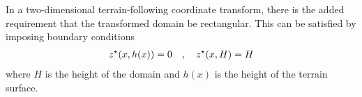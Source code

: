 In a two-dimensional terrain-following coordinate transform, there is the added requirement that the transformed domain be rectangular.  This can be satisfied by imposing boundary conditions \autocite{schaer2002}
\begin{align}
	{z^\star}(x, h(x)) = 0 \quad,\quad {z^\star}(x, H) = H
\end{align}
where $H$ is the height of the domain and $h(x)$ is the height of the terrain surface.

